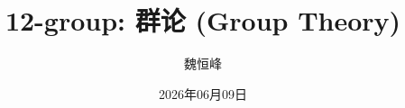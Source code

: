 \documentclass[]{beamer}
\title[12-group: 群论]{12-group: 群论 (Group Theory)}
\author[魏恒峰]{\large 魏恒峰}
\institute{hfwei@hnu.edu.cn}
\date{2026年06月09日}
\begin{document}
\maketitle






\thankyou{}

\end{document}

